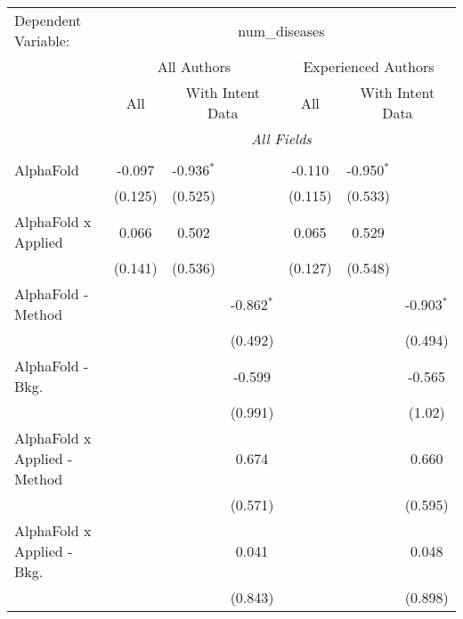 \begingroup
\centering
\begin{tabular}{lcccccc}
   \tabularnewline \midrule \midrule
   Dependent Variable: & \multicolumn{6}{c}{num\_diseases}\\
 & \multicolumn{3}{c}{All Authors} & \multicolumn{3}{c}{Experienced Authors} \\
\cmidrule(lr){2-4} \cmidrule(lr){5-7}
 & \multicolumn{1}{c}{All} & \multicolumn{2}{c}{With Intent Data} & \multicolumn{1}{c}{All} & \multicolumn{2}{c}{With Intent Data} \\
\cmidrule(lr){2-2} \cmidrule(lr){3-4} \cmidrule(lr){5-5} \cmidrule(lr){6-7}
 & \multicolumn{6}{c}{\textit{All Fields}} \\ \\
   AlphaFold                    & -0.097        & -0.936$^{*}$ &              & -0.110        & -0.950$^{*}$ &   \\   
                                & (0.125)       & (0.525)      &              & (0.115)       & (0.533)      &   \\   
   AlphaFold x Applied          & 0.066         & 0.502        &              & 0.065         & 0.529        &   \\   
                                & (0.141)       & (0.536)      &              & (0.127)       & (0.548)      &   \\   
   AlphaFold - Method           &               &              & -0.862$^{*}$ &               &              & -0.903$^{*}$\\   
                                &               &              & (0.492)      &               &              & (0.494)\\   
   AlphaFold - Bkg.             &               &              & -0.599       &               &              & -0.565\\   
                                &               &              & (0.991)      &               &              & (1.02)\\   
   AlphaFold x Applied - Method &               &              & 0.674        &               &              & 0.660\\   
                                &               &              & (0.571)      &               &              & (0.595)\\   
   AlphaFold x Applied - Bkg.   &               &              & 0.041        &               &              & 0.048\\   
                                &               &              & (0.843)      &               &              & (0.898)\\   

\end{tabular}
